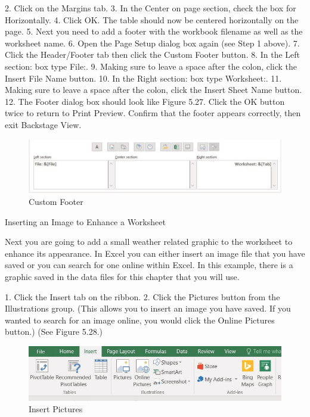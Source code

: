 2.   Click on the Margins tab.
3.   In the Center on page section, check the box for Horizontally.
4.   Click OK. The table should now be centered horizontally on the page.
5.   Next you need to add a footer with the workbook filename as well as the worksheet name.
6.   Open the Page Setup dialog box again (see Step 1 above).
7.   Click the Header/Footer tab then click the Custom Footer button.
8.   In the Left section: box type File:.
9.   Making sure to leave a space after the colon, click the Insert File Name button.
10.   In the Right section: box type Worksheet:.
11.   Making sure to leave a space after the colon, click the Insert Sheet Name button.
12.   The Footer dialog box should look like Figure 5.27. Click the OK button twice to return to Print
Preview. Confirm that the footer appears correctly, then exit Backstage View.



\begin{figure}[H]
	\centering
	\includegraphics[width=\maxwidth{.95\linewidth}]{gfx/ch05_fig27}
	\caption{Custom Footer}
	\label{05:fig27}
\end{figure}





Inserting an Image to Enhance a Worksheet

Next you are going to add a small weather related graphic to the worksheet to enhance its appearance.
In Excel you can either insert an image file that you have saved or you can search for one online within
Excel. In this example, there is a graphic saved in the data files for this chapter that you will use.

1. Click the Insert tab on the ribbon.
2. Click the Pictures button from the Illustrations group. (This allows you to insert an image you
have saved. If you wanted to search for an image online, you would click the Online Pictures
button.) (See Figure 5.28.)


\begin{figure}[H]
	\centering
	\includegraphics[width=\maxwidth{.95\linewidth}]{gfx/ch05_fig28}
	\caption{Insert Pictures}
	\label{05:fig28}
\end{figure}





